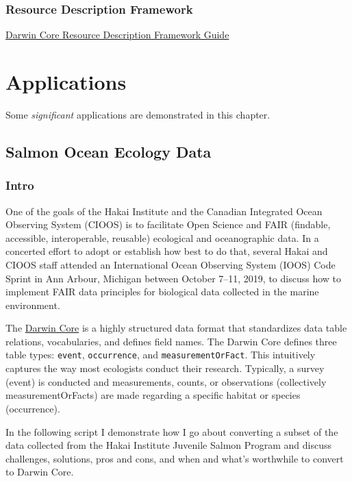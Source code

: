 \documentclass[
]{book}
\begin{document}
\hypertarget{resource-description-framework}{%
\subsection{Resource Description Framework}\label{resource-description-framework}}

\href{https://dwc.tdwg.org/rdf/}{Darwin Core Resource Description Framework Guide}

\hypertarget{applications}{%
\chapter{Applications}\label{applications}}

Some \emph{significant} applications are demonstrated in this chapter.

\hypertarget{salmon-ocean-ecology-data}{%
\section{Salmon Ocean Ecology Data}\label{salmon-ocean-ecology-data}}

\hypertarget{intro-1}{%
\subsection{Intro}\label{intro-1}}

One of the goals of the Hakai Institute and the Canadian Integrated Ocean Observing System (CIOOS) is to facilitate Open Science and FAIR (findable, accessible, interoperable, reusable) ecological and oceanographic data. In a concerted effort to adopt or establish how best to do that, several Hakai and CIOOS staff attended an International Ocean Observing System (IOOS) Code Sprint in Ann Arbour, Michigan between October 7--11, 2019, to discuss how to implement FAIR data principles for biological data collected in the marine environment.

The \href{https://dwc.tdwg.org}{Darwin Core} is a highly structured data format that standardizes data table relations, vocabularies, and defines field names. The Darwin Core defines three table types: \texttt{event}, \texttt{occurrence}, and \texttt{measurementOrFact}. This intuitively captures the way most ecologists conduct their research. Typically, a survey (event) is conducted and measurements, counts, or observations (collectively measurementOrFacts) are made regarding a specific habitat or species (occurrence).

In the following script I demonstrate how I go about converting a subset of the data collected from the Hakai Institute Juvenile Salmon Program and discuss challenges, solutions, pros and cons, and when and what's worthwhile to convert to Darwin Core.
\end{document}
